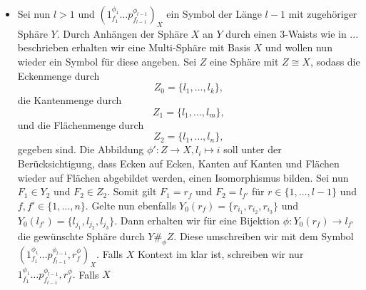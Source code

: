 \documentclass[12pt,titlepage,twoside,cleardoublepage]{article}
\theoremstyle{nummermitklammern}
\numberwithin{equation}{section}
\begin{document}
\begin{itemize}
\item Sei nun $l> 1$ und $(1_{f_1}^{\phi_1}\ldots p_{f_{l-1}}^{\phi_{l-1}})_X$ ein Symbol der Länge $l-1$ mit zugehöriger Sphäre $Y.$ Durch Anhängen der Sphäre $X$ an $Y$ durch einen 3-Waists wie in ... beschrieben erhalten wir eine Multi-Sphäre mit Basis $X$ und wollen nun wieder ein Symbol für diese angeben.
Sei $Z$ eine Sphäre mit $Z\cong X$, sodass die Eckenmenge durch 
\[
Z_0=\{l_1,\ldots,l_k\},
\]
die Kantenmenge durch 
\[
Z_1=\{l_1,\ldots,l_m\},
\]
und die Flächenmenge durch 
\[
Z_2=\{l_1,\ldots,l_n\},
\]
gegeben sind. Die Abbildung $\phi':Z\to X,l_i\mapsto i$ soll unter der Berücksichtigung, dass Ecken auf Ecken, Kanten auf Kanten und Flächen wieder auf Flächen abgebildet werden, einen Isomorphismus bilden. Sei nun $F_1\in Y_2$ und $F_2\in Z_2.$ Somit gilt  $F_1=r_f$ und $F_2=l_{f'}$  für $r\in \{1,\ldots,l-1\}$ und $f,f'\in \{1,\ldots,n \}$. Gelte nun ebenfalls $Y_0(r_f)=\{r_{i_1},r_{i_2},r_{i_3}\}$ und $Y_0(l_{f'})=\{l_{j_1},l_{j_2},l_{j_3}\}$. Dann erhalten wir für eine Bijektion $\phi:Y_0(r_f)\to l_{f'}$ die gewünschte Sphäre durch $Y\#_{\phi } Z.$ Diese umschreiben wir mit dem Symbol $(1_{f_1}^{\phi_1}\ldots p_{f_{l-1}}^{\phi_{l-1}},r^\phi_{f})_X.$ Falls $X$ Kontext im klar ist, schreiben wir nur $1_{f_1}^{\phi_1}\ldots p_{f_{l-1}}^{\phi_{l-1}},r^\phi_{f}.$ Falls $X$
\end{itemize}
\end{document}
